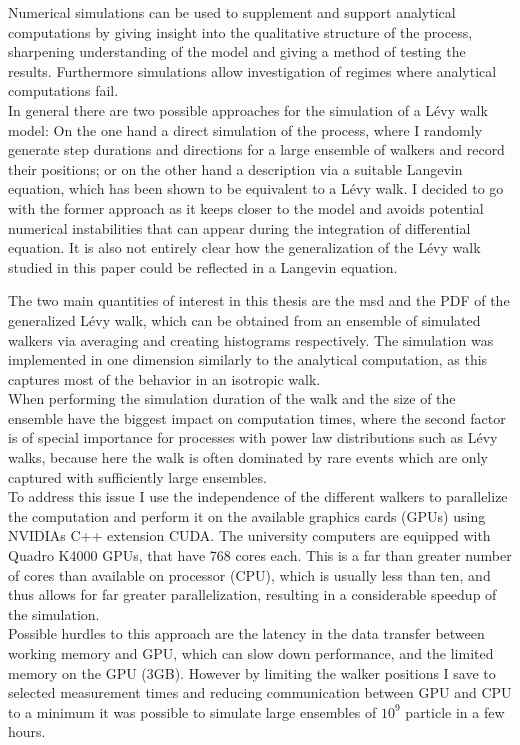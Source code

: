 Numerical simulations can be used to supplement and support analytical computations by giving insight into the qualitative structure of the process, sharpening understanding of the model and giving a method of testing the results. Furthermore simulations allow investigation of regimes where analytical computations fail.\\
{\color{blue}
In general there are two possible approaches for the simulation of a L\'evy walk model: On the one hand a direct simulation of the process, where I randomly generate step durations and directions for a large ensemble of walkers and record their positions; or on the other hand a description via a suitable Langevin equation, which has been shown to be equivalent to a L\'evy walk. 
I decided to go with the former approach as it keeps closer to the model and avoids potential numerical instabilities that can appear during the integration of differential equation. It is also not entirely clear how the generalization of the L\'evy walk studied in this paper could be reflected in a Langevin equation. \\
}

The two main quantities of interest in this thesis are the \gls{msd} and the \gls{PDF} of the generalized L\'evy walk, which can be obtained from an ensemble of simulated walkers via averaging and creating histograms respectively. The simulation was implemented in one dimension similarly to the analytical computation, as this captures most of the behavior in an isotropic walk. \\
When performing the simulation duration of the walk and the size of the ensemble have the biggest impact on computation times, where the second factor is of special importance for processes with power law distributions such as L\'evy walks, because here the walk is often dominated by rare events which are only captured with sufficiently large ensembles. \\
To address this issue I use the independence of the different walkers to parallelize the computation and perform it on the available graphics cards (GPUs) using NVIDIAs C++ extension CUDA. The university computers are equipped with Quadro K4000 GPUs, that have 768 cores each. This is a far than greater number of cores than available on processor (CPU), which is usually less than ten, and thus allows for far greater parallelization, resulting in a considerable speedup of the simulation.  \\
Possible hurdles to this approach are the latency in the data transfer between working memory and GPU, which can slow down performance, and the limited memory on the GPU (3GB). However by limiting the walker positions I save to selected measurement times and reducing communication between GPU and CPU to a minimum it was possible to simulate large ensembles of $10^9$ particle in a few hours. \\

